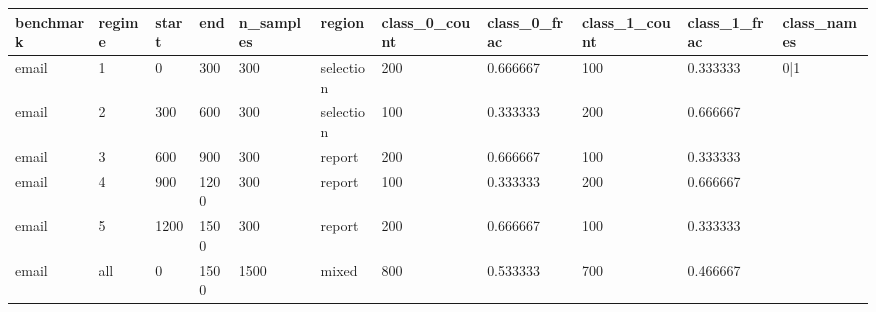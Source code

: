 \begin{tabular}{lllllllllll}
\hline
benchmark & regime & start & end & n\_samples & region & class\_0\_count & class\_0\_frac & class\_1\_count & class\_1\_frac & class\_names \\
\hline
email & 1 & 0 & 300 & 300 & selection & 200 & 0.666667 & 100 & 0.333333 & 0|1 \\
email & 2 & 300 & 600 & 300 & selection & 100 & 0.333333 & 200 & 0.666667 &  \\
email & 3 & 600 & 900 & 300 & report & 200 & 0.666667 & 100 & 0.333333 &  \\
email & 4 & 900 & 1200 & 300 & report & 100 & 0.333333 & 200 & 0.666667 &  \\
email & 5 & 1200 & 1500 & 300 & report & 200 & 0.666667 & 100 & 0.333333 &  \\
email & all & 0 & 1500 & 1500 & mixed & 800 & 0.533333 & 700 & 0.466667 &  \\
\hline
\end{tabular}

